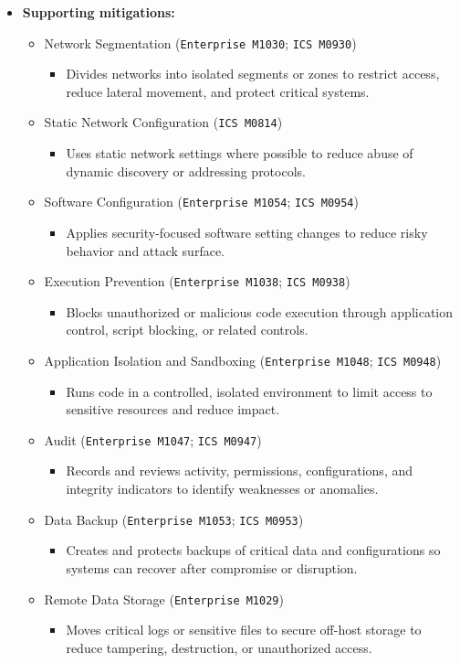 \documentclass[10pt,a4paper,oneside]{report}
\begin{document}
\begin{itemize}
\item \textbf{Supporting mitigations:}
\begin{itemize}
\item Network Segmentation (\texttt{Enterprise M1030}; \texttt{ICS M0930})
\begin{itemize}
\item Divides networks into isolated segments or zones to restrict access, reduce lateral movement, and protect critical systems.
\end{itemize}
\item Static Network Configuration (\texttt{ICS M0814})
\begin{itemize}
\item Uses static network settings where possible to reduce abuse of dynamic discovery or addressing protocols.
\end{itemize}
\item Software Configuration (\texttt{Enterprise M1054}; \texttt{ICS M0954})
\begin{itemize}
\item Applies security-focused software setting changes to reduce risky behavior and attack surface.
\end{itemize}
\item Execution Prevention (\texttt{Enterprise M1038}; \texttt{ICS M0938})
\begin{itemize}
\item Blocks unauthorized or malicious code execution through application control, script blocking, or related controls.
\end{itemize}
\item Application Isolation and Sandboxing (\texttt{Enterprise M1048}; \texttt{ICS M0948})
\begin{itemize}
\item Runs code in a controlled, isolated environment to limit access to sensitive resources and reduce impact.
\end{itemize}
\item Audit (\texttt{Enterprise M1047}; \texttt{ICS M0947})
\begin{itemize}
\item Records and reviews activity, permissions, configurations, and integrity indicators to identify weaknesses or anomalies.
\end{itemize}
\item Data Backup (\texttt{Enterprise M1053}; \texttt{ICS M0953})
\begin{itemize}
\item Creates and protects backups of critical data and configurations so systems can recover after compromise or disruption.
\end{itemize}
\item Remote Data Storage (\texttt{Enterprise M1029})
\begin{itemize}
\item Moves critical logs or sensitive files to secure off-host storage to reduce tampering, destruction, or unauthorized access.
\end{itemize}
\end{itemize}
\end{itemize}
\end{document}
